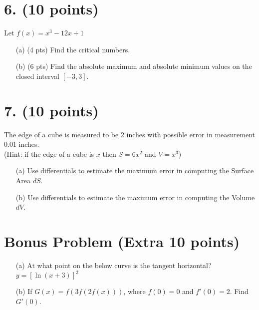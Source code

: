 \documentclass[12pt]{article}
\begin{document}
\section*{6. (10 points)}
Let \( f(x) = x^3 - 12x + 1 \)
\begin{enumerate}
    \item[(a)] (4 pts) Find the critical numbers.
    \item[(b)] (6 pts) Find the absolute maximum and absolute minimum values on the closed interval \( [-3, 3] \).
\end{enumerate}

\section*{7. (10 points)}
The edge of a cube is measured to be 2 inches with possible error in measurement 0.01 inches. \\
(Hint: if the edge of a cube is \( x \) then \( S = 6x^2 \) and \( V = x^3 \))
\begin{enumerate}
    \item[(a)] Use differentials to estimate the maximum error in computing the Surface Area \( dS \).
    \item[(b)] Use differentials to estimate the maximum error in computing the Volume \( dV \).
\end{enumerate}

\section*{Bonus Problem (Extra 10 points)}
\begin{enumerate}
    \item[(a)] At what point on the below curve is the tangent horizontal? \\
    \( y = [\ln(x + 3)]^2 \)
    \item[(b)] If \( G(x) = f(3f(2f(x))) \), where \( f(0) = 0 \) and \( f'(0) = 2 \). Find \( G'(0) \).
\end{enumerate}
\end{document}
